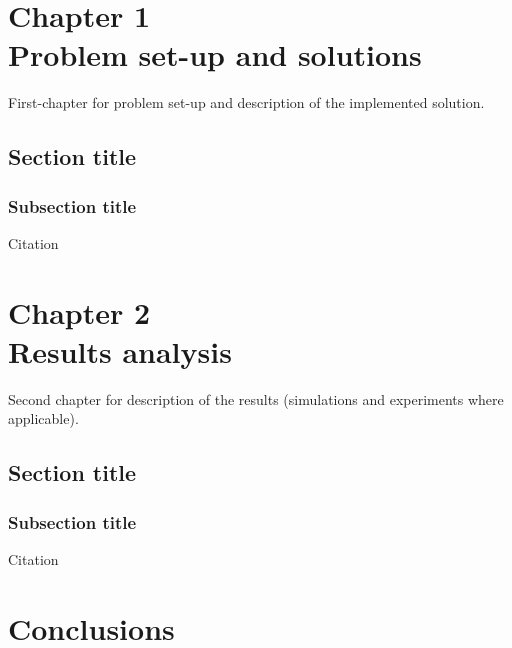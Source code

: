 \documentclass[a4paper,11pt,oneside]{book}
\begin{document}
\chapter{Chapter 1\\Problem set-up and solutions}
First-chapter for problem set-up and description of the implemented solution. 

\section{Section title}
\subsection {Subsection title}

Citation \cite{MR-GB:11}


\chapter{Chapter 2\\Results analysis}
Second chapter for description of the results (simulations and experiments where
applicable).
\section{Section title}
\subsection {Subsection title}

Citation \cite{MR-GB:11}



\chapter*{Conclusions} %


{}

\end{document}
